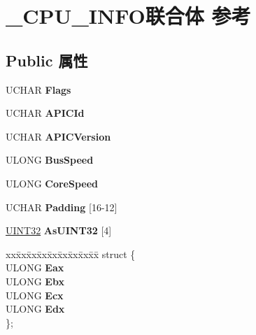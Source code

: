 \hypertarget{struct___c_p_u___i_n_f_o}{}\section{\+\_\+\+C\+P\+U\+\_\+\+I\+N\+F\+O联合体 参考}
\label{struct___c_p_u___i_n_f_o}
\subsection*{Public 属性}
\begin{DoxyCompactItemize}
\item 
\mbox{\label{struct___c_p_u___i_n_f_o_ab1ccacafa90e0e460dc98449bb180cd4}} 
U\+C\+H\+AR {\bfseries Flags}
\item 
\mbox{\label{struct___c_p_u___i_n_f_o_ab970453ec29da57986c05f6ba1d2858c}} 
U\+C\+H\+AR {\bfseries A\+P\+I\+C\+Id}
\item 
\mbox{\label{struct___c_p_u___i_n_f_o_a76ec41a5488d4d97aae8ab3d461267b9}} 
U\+C\+H\+AR {\bfseries A\+P\+I\+C\+Version}
\item 
\mbox{\label{struct___c_p_u___i_n_f_o_a9197e038892709807a0da49ae36a096d}} 
U\+L\+O\+NG {\bfseries Bus\+Speed}
\item 
\mbox{\label{struct___c_p_u___i_n_f_o_a368941b21095ac048be79cb0d1c86873}} 
U\+L\+O\+NG {\bfseries Core\+Speed}
\item 
\mbox{\label{struct___c_p_u___i_n_f_o_abd062ea9e0a654e81b2e9d5ff275c85d}} 
U\+C\+H\+AR {\bfseries Padding} \mbox{[}16-\/12\mbox{]}
\item 
\mbox{\label{struct___c_p_u___i_n_f_o_aca8b7db9b1afbdd6a90530e8170a8691}} 
\hyperlink{_processor_bind_8h_ae1e6edbbc26d6fbc71a90190d0266018}{U\+I\+N\+T32} {\bfseries As\+U\+I\+N\+T32} \mbox{[}4\mbox{]}
\item 
\mbox{\label{struct___c_p_u___i_n_f_o_a2e7c3daf06264430dc688a269b843330}} 
\begin{tabbing}
xx\=xx\=xx\=xx\=xx\=xx\=xx\=xx\=xx\=\kill
struct \{\\
\>ULONG {\bfseries Eax}\\
\>ULONG {\bfseries Ebx}\\
\>ULONG {\bfseries Ecx}\\
\>ULONG {\bfseries Edx}\\
\}; \\


\end{tabbing}
\end{DoxyCompactItemize}
